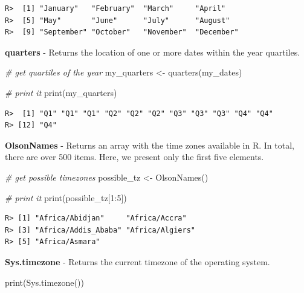 \documentclass[
  12pt,
]{book}
\newenvironment{Shaded}{\begin{snugshade}}{\end{snugshade}}
\newcommand{\CommentTok}[1]{\textcolor[rgb]{0.37,0.37,0.37}{\textit{#1}}}
\newcommand{\DecValTok}[1]{\textcolor[rgb]{0.06,0.06,0.06}{#1}}
\newcommand{\FunctionTok}[1]{\textcolor[rgb]{0,0,0}{#1}}
\newcommand{\NormalTok}[1]{#1}
\newcommand{\OtherTok}[1]{\textcolor[rgb]{0.37,0.37,0.37}{#1}}
\newcommand{\SpecialCharTok}[1]{\textcolor[rgb]{0,0,0}{#1}}
\begin{document}
\begin{verbatim}
R>  [1] "January"   "February"  "March"     "April"    
R>  [5] "May"       "June"      "July"      "August"   
R>  [9] "September" "October"   "November"  "December"
\end{verbatim}

\textbf{quarters} - Returns the location of one or more dates within the year quartiles. 

\begin{Shaded}
\begin{Highlighting}[]
\CommentTok{\# get quartiles of the year}
\NormalTok{my\_quarters }\OtherTok{\textless{}{-}} \FunctionTok{quarters}\NormalTok{(my\_dates)}

\CommentTok{\# print it}
\FunctionTok{print}\NormalTok{(my\_quarters)}
\end{Highlighting}
\end{Shaded}

\begin{verbatim}
R>  [1] "Q1" "Q1" "Q1" "Q2" "Q2" "Q2" "Q3" "Q3" "Q3" "Q4" "Q4"
R> [12] "Q4"
\end{verbatim}

\textbf{OlsonNames} - Returns an array with the time zones available in R. In total, there are over 500 items. Here, we present only the first five elements. 

\begin{Shaded}
\begin{Highlighting}[]
\CommentTok{\# get possible timezones}
\NormalTok{possible\_tz }\OtherTok{\textless{}{-}} \FunctionTok{OlsonNames}\NormalTok{()}

\CommentTok{\# print it}
\FunctionTok{print}\NormalTok{(possible\_tz[}\DecValTok{1}\SpecialCharTok{:}\DecValTok{5}\NormalTok{])}
\end{Highlighting}
\end{Shaded}

\begin{verbatim}
R> [1] "Africa/Abidjan"     "Africa/Accra"      
R> [3] "Africa/Addis_Ababa" "Africa/Algiers"    
R> [5] "Africa/Asmara"
\end{verbatim}

\textbf{Sys.timezone} - Returns the current timezone of the operating system. 

\begin{Shaded}
\begin{Highlighting}[]
\FunctionTok{print}\NormalTok{(}\FunctionTok{Sys.timezone}\NormalTok{())}
\end{Highlighting}
\end{Shaded}
\end{document}
